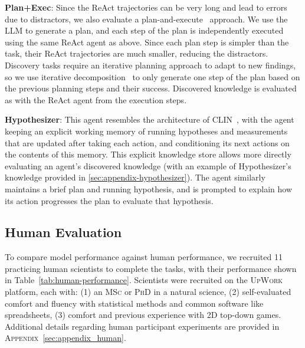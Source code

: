 \textbf{Plan+Exec}: Since the ReAct trajectories can be very long and lead to errors due to distractors, we also evaluate a plan-and-execute~\cite{wang-etal-2023-plan,intercode} approach. We use the LLM to generate a plan, and each step of the plan is independently executed using the same ReAct agent as above. Since each plan step is simpler than the task, their ReAct trajectories are much smaller, reducing the distractors.  Discovery tasks require an iterative planning approach to adapt to new findings, so we use iterative decomposition~\cite{decomp} to only generate one step of the plan based on the previous planning steps and their success. %
Discovered knowledge is evaluated as with the ReAct agent from the execution steps.

\textbf{Hypothesizer}: This agent resembles the architecture of \textsc{CLIN}~\cite{Majumder2023CLINAC}, with the agent keeping an explicit working memory of running hypotheses and measurements that are updated after taking each action, and conditioning its next actions on the contents of this memory.  This explicit knowledge store allows more directly evaluating an agent's discovered knowledge (with an example of Hypothesizer's knowledge provided in \autoref{sec:appendix-hypothesizer}).  The agent similarly maintains a brief plan and running hypothesis, and is prompted to explain how its action progresses the plan to evaluate that hypothesis. %



\subsection{Human Evaluation}

To compare model performance against human performance, we recruited 11 practicing human scientists to complete the \env tasks, with their performance shown in Table~\ref{tab:human-performance}.  Scientists were recruited on the \textsc{UpWork} platform, each with: (1) an \textsc{MSc} or \textsc{PhD} in a natural science, (2) self-evaluated comfort and fluency with statistical methods and common software like spreadsheets, (3) comfort and previous experience with 2D top-down games.  Additional details regarding human participant experiments are provided in \textsc{Appendix}~\ref{sec:appendix_human}.
